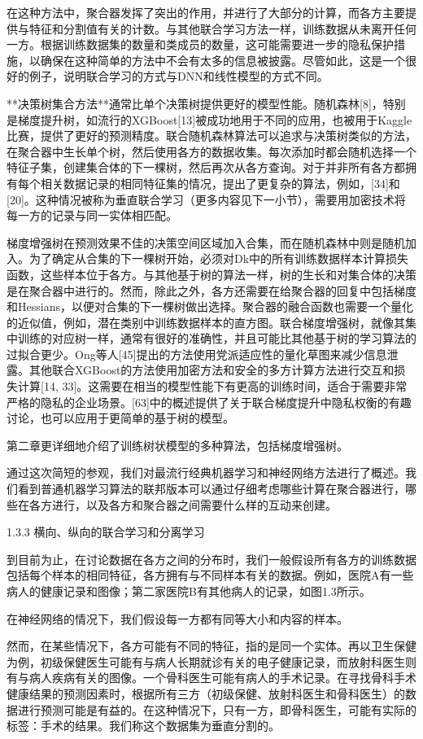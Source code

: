 在这种方法中，聚合器发挥了突出的作用，并进行了大部分的计算，而各方主要提供与特征和分割值有关的计数。与其他联合学习方法一样，训练数据从未离开任何一方。根据训练数据集的数量和类成员的数量，这可能需要进一步的隐私保护措施，以确保在这种简单的方法中不会有太多的信息被披露。尽管如此，这是一个很好的例子，说明联合学习的方式与DNN和线性模型的方式不同。

**决策树集合方法**通常比单个决策树提供更好的模型性能。随机森林[8]，特别是梯度提升树，如流行的XGBoost[13]被成功地用于不同的应用，也被用于Kaggle比赛，提供了更好的预测精度。联合随机森林算法可以追求与决策树类似的方法，在聚合器中生长单个树，然后使用各方的数据收集。每次添加时都会随机选择一个特征子集，创建集合体的下一棵树，然后再次从各方查询。对于并非所有各方都拥有每个相关数据记录的相同特征集的情况，提出了更复杂的算法，例如，[34]和[20]。这种情况被称为垂直联合学习（更多内容见下一小节），需要用加密技术将每一方的记录与同一实体相匹配。

梯度增强树在预测效果不佳的决策空间区域加入合集，而在随机森林中则是随机加入。为了确定从合集的下一棵树开始，必须对Dk中的所有训练数据样本计算损失函数，这些样本位于各方。与其他基于树的算法一样，树的生长和对集合体的决策是在聚合器中进行的。然而，除此之外，各方还需要在给聚合器的回复中包括梯度和Hessians，以便对合集的下一棵树做出选择。聚合器的融合函数也需要一个量化的近似值，例如，潜在类别中训练数据样本的直方图。联合梯度增强树，就像其集中训练的对应树一样，通常有很好的准确性，并且可能比其他基于树的学习算法的过拟合更少。Ong等人[45]提出的方法使用党派适应性的量化草图来减少信息泄露。其他联合XGBoost的方法使用加密方法和安全的多方计算方法进行交互和损失计算[14, 33]。这需要在相当的模型性能下有更高的训练时间，适合于需要非常严格的隐私的企业场景。[63]中的概述提供了关于联合梯度提升中隐私权衡的有趣讨论，也可以应用于更简单的基于树的模型。

第二章更详细地介绍了训练树状模型的多种算法，包括梯度增强树。

通过这次简短的参观，我们对最流行经典机器学习和神经网络方法进行了概述。我们看到普通机器学习算法的联邦版本可以通过仔细考虑哪些计算在聚合器进行，哪些在各方进行，以及各方和聚合器之间需要什么样的互动来创建。

1.3.3 横向、纵向的联合学习和分离学习

到目前为止，在讨论数据在各方之间的分布时，我们一般假设所有各方的训练数据包括每个样本的相同特征，各方拥有与不同样本有关的数据。例如，医院A有一些病人的健康记录和图像；第二家医院B有其他病人的记录，如图1.3所示。

在神经网络的情况下，我们假设每一方都有同等大小和内容的样本。

然而，在某些情况下，各方可能有不同的特征，指的是同一个实体。再以卫生保健为例，初级保健医生可能有与病人长期就诊有关的电子健康记录，而放射科医生则有与病人疾病有关的图像。一个骨科医生可能有病人的手术记录。在寻找骨科手术健康结果的预测因素时，根据所有三方（初级保健、放射科医生和骨科医生）的数据进行预测可能是有益的。在这种情况下，只有一方，即骨科医生，可能有实际的标签：手术的结果。我们称这个数据集为垂直分割的。

